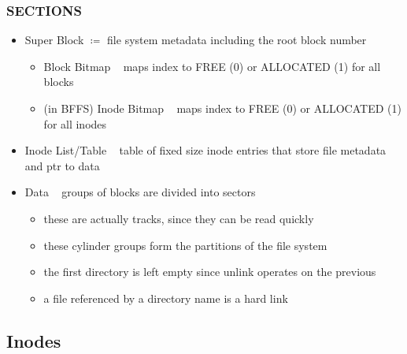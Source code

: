 \documentclass[../../lecture_notes.tex]{subfiles}
\begin{document}
\subsubsection*{SECTIONS}
\begin{itemize}
\item Super Block $\coloneqq$ file system metadata including the root block number
	\begin{itemize}
		\item Block Bitmap ~ maps index to FREE (0) or ALLOCATED (1) for all blocks
		\item (in BFFS) Inode Bitmap ~ maps index to FREE (0) or ALLOCATED (1) for all inodes
	\end{itemize}
\item Inode List/Table ~ table of fixed size inode entries that store file metadata and ptr to data
\item Data ~ groups of blocks are divided into sectors
	\begin{itemize}
		\item these are actually tracks, since they can be read quickly
		\item these cylinder groups form the partitions of the file system
		\item the first directory is left empty since unlink operates on the previous
		\item a file referenced by a directory name is a hard link
	\end{itemize}
\end{itemize}


\subsection{Inodes}
\end{document}
